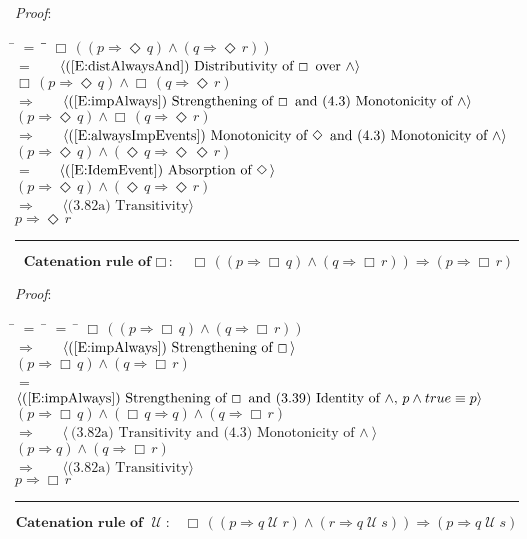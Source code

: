 \documentclass[12pt, fleqn, leqno]{article}
\newcommand{\lgap}{2pt}                             %
\newcommand{\mymathindent}{24pt}                    %
\newcommand{\impl}{\ensuremath{\Rightarrow}}        %
\newcommand{\Until}{\;\mathcal{U}\;}
\newcommand{\Event}{\Diamond\,}
\newcommand{\Always}{\Box\,}
\newcommand{\myqed}{\rule[-.23ex]{1.2ex}{2.0ex}}
\newcommand{\myqedtab}{\hspace{384pt}}              %
\newcommand{\Gll} {\langle}                         %
\newcommand{\Ggg} {\rangle}                         %
\newcommand{\Hint}[1]     {\ \ \ $\Gll              \mbox{#1} \Ggg$ }   %
\begin{document}
\emph{Proof}:
\begin{tabbing}
\hspace{\mymathindent} \= $= \;$ \= \myqedtab \= \kill
  \> \>   $\Always ( (p \impl \Event q) \land (q \impl \Event r))$\\[\lgap]
   \> $=$  \>  \Hint{(\ref{E:distAlwaysAnd}) Distributivity of $\Always$ over $\land$}\\[\lgap]
  \> \>   $\Always (p \impl \Event q) \land \Always (q \impl \Event r)$\\[\lgap]
   \> $\impl$  \>  \Hint{(\ref{E:impAlways}) Strengthening of $\Always$ and (4.3) Monotonicity of $\land$}\\[\lgap]
    \> \>   $(p \impl \Event q) \land \Always (q \impl \Event r)$\\[\lgap]
     \> $\impl$ \> \Hint{(\ref{E:alwaysImpEvents}) Monotonicity of $\Event$ and (4.3) Monotonicity of $\land$} \\[\lgap]
  \> \>   $ (p \impl \Event q) \land (\Event q \impl \Event \Event r)$\\[\lgap]
  \> $=$  \>  \Hint{(\ref{E:IdemEvent}) Absorption of $\Event$}\\[\lgap]
   \> \>   $ (p \impl \Event q) \land (\Event q \impl \Event r)$\\[\lgap]
  \> $\impl$  \>  \Hint{(3.82a) Transitivity}\\[\lgap]
  \> \>   $ p \impl \Event r$\quad \myqed
\end{tabbing}
\begin{equation}\label{E:AlwaysCatRule}
\textbf{Catenation rule of $\Always$:}\quad \Always ((p \impl \Always q) \land (q \impl \Always r)) \impl (p \impl \Always r)
\end{equation}

\emph{Proof}:
\begin{tabbing}
\hspace{\mymathindent} \= $= \;$ \= $= \;$ \= \kill
  \> \>   $\Always ((p \impl \Always q) \land (q \impl \Always r))$\\[\lgap]
  \> $\impl$  \>  \Hint{(\ref{E:impAlways}) Strengthening of $\Always$}\\[\lgap]
  \> \>   $(p \impl \Always q) \land (q \impl \Always r)$\\[\lgap]
  \> $=$  \>  \Hint{(\ref{E:impAlways}) Strengthening of $\Always$ and (3.39) Identity of $\land$, $p\land true\equiv p$}\\[\lgap]
  \> \>   $(p \impl \Always q) \land (\Always q \impl q) \land (q \impl \Always r)$\\[\lgap]
  \> $\impl$  \>  \Hint{(3.82a) Transitivity and (4.3) Monotonicity of $\land$}\\[\lgap]
  \> \>   $(p \impl q) \land (q \impl \Always r)$\\[\lgap]
  \> $\impl$  \>  \Hint{(3.82a) Transitivity}\\[\lgap]
  \> \>   $ p \impl \Always r$\quad \myqed
\end{tabbing}
\begin{equation}\label{E:UntilCatRule}
\textbf{Catenation rule of $\Until$:}\quad \Always ((p \impl q \Until r) \land (r \impl q \Until s)) \impl (p \impl q \Until s)
\end{equation}
\end{document}

